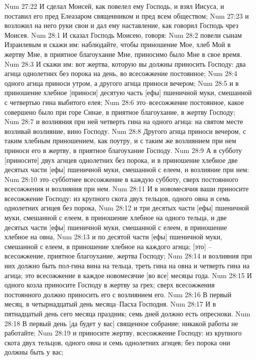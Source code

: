 Num 27:22  И сделал Моисей, как повелел ему Господь, и взял Иисуса, и поставил его пред Елеазаром священником и пред всем обществом;
Num 27:23  и возложил на него руки свои и дал ему наставление, как говорил Господь чрез Моисея.
Num 28:1  И сказал Господь Моисею, говоря:
Num 28:2  повели сынам Израилевым и скажи им: наблюдайте, чтобы приношение Мое, хлеб Мой в жертву Мне, в приятное благоухание Мне, приносимо было Мне в свое время.
Num 28:3  И скажи им: вот жертва, которую вы должны приносить Господу: два агнца однолетних без порока на день, во всесожжение постоянное;
Num 28:4  одного агнца приноси утром, а другого агнца приноси вечером;
Num 28:5  и в приношение хлебное [приноси] десятую часть [ефы] пшеничной муки, смешанной с четвертью гина выбитого елея;
Num 28:6  это--всесожжение постоянное, какое совершено было при горе Синае, в приятное благоухание, в жертву Господу;
Num 28:7  и возлияния при ней четверть гина на одного агнца: на святом месте возливай возлияние, вино Господу.
Num 28:8  Другого агнца приноси вечером, с таким хлебным приношением, как поутру, и с таким же возлиянием при нем приноси его в жертву, в приятное благоухание Господу.
Num 28:9  А в субботу [приносите] двух агнцев однолетних без порока, и в приношение хлебное две десятых части [ефы] пшеничной муки, смешанной с елеем, и возлияние при нем:
Num 28:10  это--субботнее всесожжение в каждую субботу, сверх постоянного всесожжения и возлияния при нем.
Num 28:11  И в новомесячия ваши приносите всесожжение Господу: из крупного скота двух тельцов, одного овна и семь однолетних агнцев без порока,
Num 28:12  и три десятых части [ефы] пшеничной муки, смешанной с елеем, в приношение хлебное на одного тельца, и две десятых части [ефы] пшеничной муки, смешанной с елеем, в приношение хлебное на овна,
Num 28:13  и по десятой части [ефы] пшеничной муки, смешанной с елеем, в приношение хлебное на каждого агнца; [это] --всесожжение, приятное благоухание, жертва Господу;
Num 28:14  и возлияния при них должно быть пол-гина вина на тельца, треть гина на овна и четверть гина на агнца; это всесожжение в каждое новомесячие [во все] месяцы года.
Num 28:15  И одного козла приносите Господу в жертву за грех; сверх всесожжения постоянного должно приносить его с возлиянием его.
Num 28:16  В первый месяц, в четырнадцатый день месяца--Пасха Господня.
Num 28:17  И в пятнадцатый день сего месяца праздник; семь дней должно есть опресноки.
Num 28:18  В первый день [да будет у вас] священное собрание; никакой работы не работайте;
Num 28:19  и приносите жертву, всесожжение Господу: из крупного скота двух тельцов, одного овна и семь однолетних агнцев; без порока они должны быть у вас;
